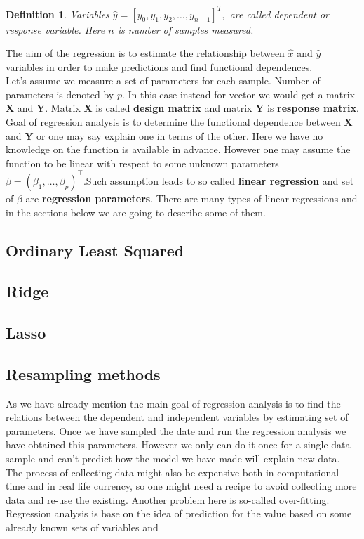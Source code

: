 \documentclass[10pt]{article}
\newtheorem{defn}{Definition}
\begin{document}
\begin{defn}
	Variables  $\hat{y} = [y_0,y_1, y_2,\dots, y_{n-1}]^T,$ are called dependent or response variable. Here $n$ is number of samples measured.
\end{defn}
The aim of the regression is to estimate the relationship between $\hat{x}$ and $\hat{y}$ variables in order to make predictions and find functional dependences. \\
Let's assume we measure a set of parameters for each sample. Number of parameters is denoted by $p$. In this case instead for vector we would get a matrix $\textbf{X}$ and $\textbf{Y}$. Matrix $\textbf{X}$ is called \textbf{design matrix} and matrix $\textbf{Y}$ is \textbf{response matrix}. Goal of regression analysis is to determine the functional dependence between $\textbf{X}$ and $\textbf{Y}$ or one may say explain one in terms of the other. Here we have no knowledge on the function is available in advance. However one may assume the function to be linear with respect to some unknown parameters $\beta = (\beta_1, \ldots, \beta_p)^{\top}$.Such assumption leads to so called \textbf{linear regression} and set of $\beta$  are \textbf{regression parameters}. There are many types of linear regressions and in the sections below we are going to describe some of them.
\subsection{Ordinary Least Squared}

\subsection{Ridge}

\subsection{Lasso}

\subsection{Resampling methods}
As we have already mention the main goal of regression analysis is to find the relations between the dependent and independent variables by estimating set of parameters. Once we have sampled the date and run the regression analysis we have obtained this parameters. However we only can do it once for a single data sample and can't predict how the model we have made will explain new data. The process of collecting data might also be expensive both in computational time and in real life currency, so one might need a recipe to avoid collecting more data and re-use the existing. Another problem here is so-called over-fitting. Regression analysis is base on the idea of prediction for the value based on some already known sets of variables and 
\end{document}
